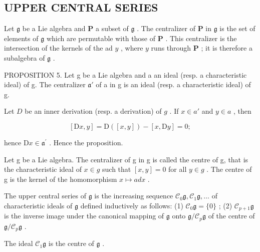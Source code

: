 \subsection{UPPER CENTRAL SERIES}

Let \(\mathfrak{g}\) be a Lie algebra and \(\mathbf{P}\) a subset of \(\mathfrak{g}\) . The centralizer of \(\mathbf{P}\) in \(\mathfrak{g}\) is the set of elements of \(\mathfrak{g}\) which are permutable with those of \(\mathbf{P}\) . This centralizer is the intersection of the kernels of the ad \(y\) , where \(y\) runs through \(\mathbf{P}\) ; it is therefore a subalgebra of \(\mathfrak{g}\) .

PROPOSITION 5. Let g be a Lie algebra and a an ideal (resp. a characteristic ideal) of g. The centralizer \(\mathfrak{a}'\) of a in g is an ideal (resp. a characteristic ideal) of g.

Let \(D\) be an inner derivation (resp. a derivation) of \(g\) . If \(x \in a'\) and \(y \in a\) , then

\[
[ \mathrm{D} x, y ] = \mathrm{D} ([ x, y ]) - [ x, \mathrm{D} y ] = 0;
\]

hence \(\mathrm{D}x\in \mathfrak{a}^{\prime}\) . Hence the proposition.

Let g be a Lie algebra. The centralizer of g in g is called the centre of g, that is the characteristic ideal of \(x \in g\) such that \([x, y] = 0\) for all \(y \in g\) . The centre of g is the kernel of the homomorphism \(x \mapsto ad x\) .

The upper central series of \(\mathfrak{g}\) is the increasing sequence \(\mathcal{C}_{0}\mathfrak{g},\mathcal{C}_{1}\mathfrak{g},\ldots\) of characteristic ideals of \(\mathfrak{g}\) defined inductively as follows: (1) \(\mathcal{C}_{0}\mathfrak{g} = \{0\}\) ; (2) \(\mathcal{C}_{p + 1}\mathfrak{g}\) is the inverse image under the canonical mapping of \(\mathfrak{g}\) onto \(\mathfrak{g} / \mathcal{C}_{p}\mathfrak{g}\) of the centre of \(\mathfrak{g} / \mathcal{C}_{p}\mathfrak{g}\) .

The ideal \(\mathcal{C}_{1}\mathfrak{g}\) is the centre of \(\mathfrak{g}\) .

